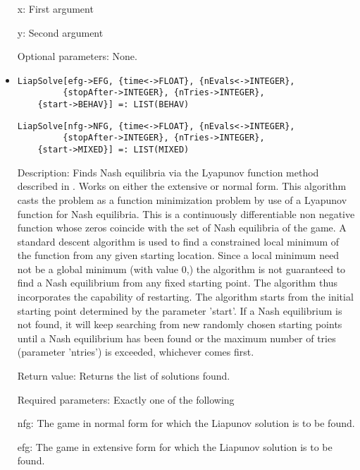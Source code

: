\begin{itemize}
\bd
\item
[x:] First argument
\item
[y:] Second argument
\ed
\item
[Optional parameters:] None.
\ed

\item
\protect \large \begin{verbatim}
LiapSolve[efg->EFG, {time<->FLOAT}, {nEvals<->INTEGER},
         {stopAfter->INTEGER}, {nTries->INTEGER}, 
	{start->BEHAV}] =: LIST(BEHAV)
\end{verbatim}\normalsize

\protect \large \begin{verbatim}
LiapSolve[nfg->NFG, {time<->FLOAT}, {nEvals<->INTEGER},
         {stopAfter->INTEGER}, {nTries->INTEGER},
	{start->MIXED}] =: LIST(MIXED)
\end{verbatim}\normalsize


\bd
\item
[Description:] Finds Nash equilibria via the Lyapunov function method
described in \cite[1991]{McK:91}.  Works on either the
extensive or normal form.  This algorithm casts the problem as a
function minimization problem by use of a Lyapunov function for Nash
equilibria.  This is a continuously differentiable non negative
function whose zeros coincide with the set of Nash equilibria of the
game.  A standard descent algorithm is used to find a constrained
local minimum of the function from any given starting location.  Since
a local minimum need not be a global minimum (with value 0,) the
algorithm is not guaranteed to find a Nash equilibrium from any fixed
starting point.  The algorithm thus incorporates the capability of
restarting.  The algorithm starts from the initial starting point
determined by the parameter 'start'.  If a Nash equilibrium is not
found, it will keep searching from new randomly chosen starting points
until a Nash equilibrium has been found or the maximum number of tries
(parameter 'ntries') is exceeded, whichever comes first.
\item
[Return value:] Returns the list of solutions found.
\item
[Required parameters:] Exactly one of the following \hfil\null

\bd
\item
[nfg:] The game in normal form for which the Liapunov solution is to
be found.
\item
[efg:] The game in extensive form for which the Liapunov solution is
to be found.
\ed


\end{itemize}
